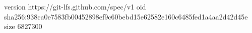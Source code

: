 version https://git-lfs.github.com/spec/v1
oid sha256:938ca0e7583fb00452898ef9c60bebd15e62582e160c6485fed1a4aa2d42d45e
size 6827300
